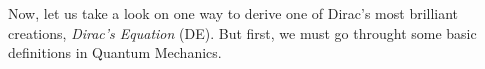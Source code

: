 \documentclass[a4page,12pt]{article}
\newcommand{\eqL}[2]{
	\begin{equation} \label{#1}
		#2
	\end{equation}
}
\begin{document}
Now, let us take a look on one way to derive one of Dirac's most brilliant creations, \emph {Dirac's Equation} (DE). But first, we must go throught some basic definitions in Quantum Mechanics.


\begin{comment}

	\subsection{Tensors and four vectors.}

	 	We will need some information on tensors and four vectors before we move forward.
		
		\subsubsection{Contravariant four vector of momentum.}

			The contravariant four vector of momentum of a particle with particular energy, $E$, and three momentum, $\vec{p}$, is defined as following.

			\[
				p^\mu =
				\begin{pmatrix}
					p^0 & p^1 & p^2 & p^3
				\end{pmatrix}
			\]	
		
			\eqL{fourMomentum}{
				p^\mu = 
				\begin{pmatrix}
					\frac{E}{c} & \vec{p}
				\end{pmatrix}
			}

		\subsubsection{Minkowski metric tensor.}

			Minkowski Metric Tensor, is a rank two tensor we will be using for deriving DE. It is defined as following.

		\eqL{metricTensor}{ 
			\eta_{\mu \nu} = 
			\begin{pmatrix}
				1 & 0 & 0 & 0\\
				0 & -1 & 0 & 0\\
				0 & 0 & -1 & 0\\
				0 & 0 & 0 & -1\\
			\end{pmatrix}
		}


\end{comment}
\end{document}
